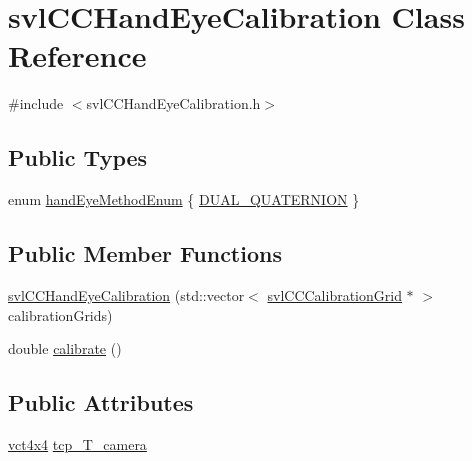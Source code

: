 \hypertarget{classsvl_c_c_hand_eye_calibration}{\section{svl\-C\-C\-Hand\-Eye\-Calibration Class Reference}
\label{classsvl_c_c_hand_eye_calibration}
}


{\ttfamily \#include $<$svl\-C\-C\-Hand\-Eye\-Calibration.\-h$>$}

\subsection*{Public Types}
\begin{DoxyCompactItemize}
\item 
enum \hyperlink{classsvl_c_c_hand_eye_calibration_a709466a8de18bc0010a220b0ffab4bbc}{hand\-Eye\-Method\-Enum} \{ \hyperlink{classsvl_c_c_hand_eye_calibration_a709466a8de18bc0010a220b0ffab4bbca6fc494defb9d979714fe0c2070971364}{D\-U\-A\-L\-\_\-\-Q\-U\-A\-T\-E\-R\-N\-I\-O\-N}
 \}
\end{DoxyCompactItemize}
\subsection*{Public Member Functions}
\begin{DoxyCompactItemize}
\item 
\hyperlink{classsvl_c_c_hand_eye_calibration_a84520fb144cce8d20e1f861521e6dc10}{svl\-C\-C\-Hand\-Eye\-Calibration} (std\-::vector$<$ \hyperlink{classsvl_c_c_calibration_grid}{svl\-C\-C\-Calibration\-Grid} $\ast$ $>$ calibration\-Grids)
\item 
double \hyperlink{classsvl_c_c_hand_eye_calibration_a3345f9c7cc91df6323b6393bbd6645f6}{calibrate} ()
\end{DoxyCompactItemize}
\subsection*{Public Attributes}
\begin{DoxyCompactItemize}
\item 
\hyperlink{vct_fixed_size_matrix_types_8h_abd214ec98373cc3197c87dfd916c673f}{vct4x4} \hyperlink{classsvl_c_c_hand_eye_calibration_a9dc79ab1c083e9f9baa017aa43545b1f}{tcp\-\_\-\-T\-\_\-camera}
\end{DoxyCompactItemize}


